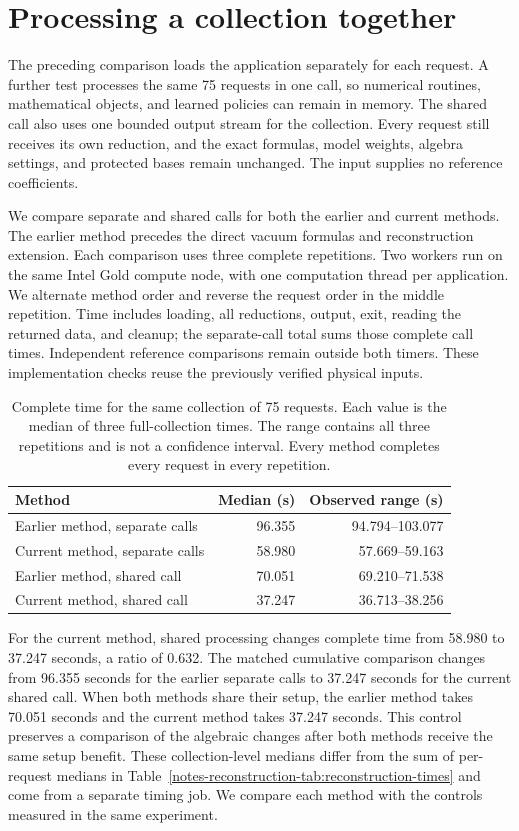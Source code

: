 \section{Processing a collection together}
\label{notes-shared-application:method}
The preceding comparison loads the application separately for each request. A further test processes the same 75 requests in one call, so numerical routines, mathematical objects, and learned policies can remain in memory. The shared call also uses one bounded output stream for the collection. Every request still receives its own reduction, and the exact formulas, model weights, algebra settings, and protected bases remain unchanged. The input supplies no reference coefficients.

We compare separate and shared calls for both the earlier and current methods. The earlier method precedes the direct vacuum formulas and reconstruction extension. Each comparison uses three complete repetitions. Two workers run on the same Intel Gold compute node, with one computation thread per application. We alternate method order and reverse the request order in the middle repetition. Time includes loading, all reductions, output, exit, reading the returned data, and cleanup; the separate-call total sums those complete call times. Independent reference comparisons remain outside both timers. These implementation checks reuse the previously verified physical inputs.

\begin{table}[htbp]
\centering\small
\caption{Complete time for the same collection of 75 requests. Each value is the median of three full-collection times. The range contains all three repetitions and is not a confidence interval. Every method completes every request in every repetition.}
\label{notes-shared-application:times}
\begin{tabular}{lrr}
\toprule
Method & Median (s) & Observed range (s)\\
\midrule
Earlier method, separate calls & 96.355 & 94.794--103.077 \\
Current method, separate calls & 58.980 & 57.669--59.163 \\
Earlier method, shared call & 70.051 & 69.210--71.538 \\
Current method, shared call & 37.247 & 36.713--38.256 \\
\bottomrule
\end{tabular}
\end{table}

For the current method, shared processing changes complete time from 58.980 to 37.247 seconds, a ratio of 0.632. The matched cumulative comparison changes from 96.355 seconds for the earlier separate calls to 37.247 seconds for the current shared call. When both methods share their setup, the earlier method takes 70.051 seconds and the current method takes 37.247 seconds. This control preserves a comparison of the algebraic changes after both methods receive the same setup benefit. These collection-level medians differ from the sum of per-request medians in Table~\ref{notes-reconstruction-tab:reconstruction-times} and come from a separate timing job. We compare each method with the controls measured in the same experiment.

